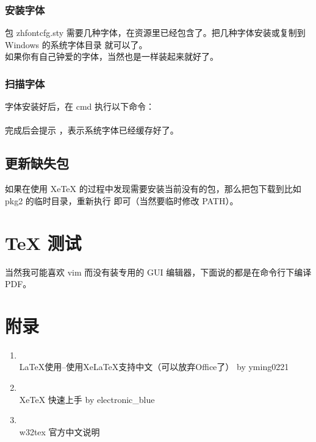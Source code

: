 \documentclass{article}
\begin{document}
\subsubsection{安装字体}
包 zhfontcfg.sty 需要几种字体，在资源里已经包含了。把几种字体安装或复制到 Windows 的系统字体目录  就可以了。\\
如果你有自己钟爱的字体，当然也是一样装起来就好了。\par

\subsubsection{扫描字体}
字体安装好后，在 cmd 执行以下命令：\\
\\
完成后会提示 ，表示系统字体已经缓存好了。\par

\subsection{更新缺失包}
如果在使用 XeTeX 的过程中发现需要安装当前没有的包，那么把包下载到比如 pkg2 的临时目录，重新执行  即可（当然要临时修改 PATH）。\par

\section{TeX 测试}
当然我可能喜欢 vim 而没有装专用的 GUI 编辑器，下面说的都是在命令行下编译 PDF。\par

\section{附录}
\begin{enumerate}
\item {} \\
LaTeX使用--使用XeLaTeX支持中文（可以放弃Office了） by yming0221 \\
\item {} \\
XeTeX 快速上手 by electronic\_blue \\
\item {} \\
w32tex 官方中文说明 \\
\end{enumerate}
\end{document}
